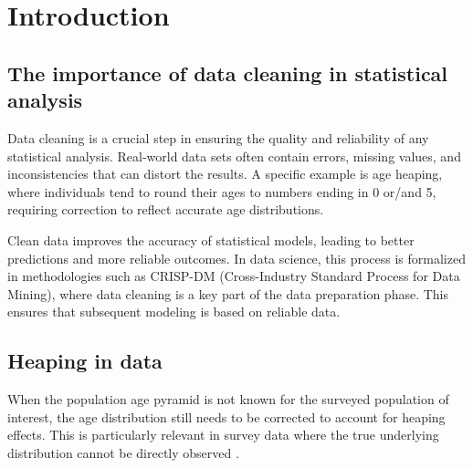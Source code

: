 \documentclass[pdflatex,sn-mathphys-num]{sn-jnl}%
\theoremstyle{thmstyleone}%
\theoremstyle{thmstyletwo}%
\theoremstyle{thmstylethree}%
\begin{document}



\maketitle

\section{Introduction}\label{sec1}

\subsection{The importance of data cleaning in statistical analysis}

Data cleaning is a crucial step in ensuring the quality and reliability of any statistical analysis. Real-world data sets often contain errors, missing values, and inconsistencies that can distort the results. A specific example is age heaping, where individuals tend to round their ages to numbers ending in 0 or/and 5, requiring correction to reflect accurate age distributions.

Clean data improves the accuracy of statistical models, leading to better predictions and more reliable outcomes. In data science, this process is formalized in methodologies such as CRISP-DM (Cross-Industry Standard Process for Data Mining), where data cleaning is a key part of the data preparation phase. This ensures that subsequent modeling is based on reliable data.


\subsection{Heaping in data}

When the population age pyramid is not known for the surveyed population of interest, the age distribution still needs to be corrected to account for heaping effects. This is particularly relevant in survey data where the true underlying distribution cannot be directly observed \citep{ewbank1981}.
\end{document}
